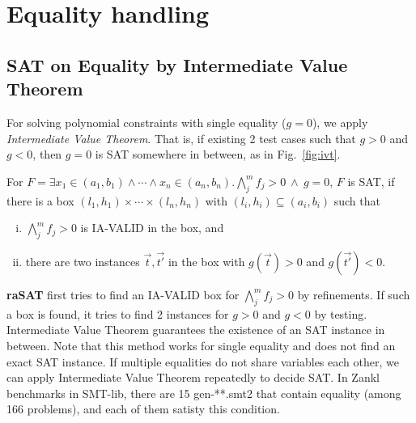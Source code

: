 \chapter{Equality handling}

\section{SAT on Equality by Intermediate Value Theorem} \label{sec:eq}
For solving polynomial constraints with single equality ($g=0$), we apply {\em Intermediate Value Theorem}. 
That is, if existing 2 test cases such that $g > 0$ and $g < 0$, then $g=0$ is SAT somewhere in between, 
as in Fig.~\ref{fig:ivt}. 

\begin{lemma} \label{lemma:ivt}
For $F = \exists x_1 \in (a_1,b_1) \wedge \cdots \wedge x_n \in (a_n,b_n). 
\bigwedge \limits_{j}^m f_j > 0~\wedge~g = 0$, $F$ is SAT, if 
there is a box $(l_1, h_1) \times \cdots \times (l_n,h_n)$ with $ (l_i,h_i) \subseteq (a_i,b_i)$ 
such that 
\begin{enumerate}[(i)]
\item $\bigwedge \limits_{j}^m f_j > 0$ is IA-VALID in the box, and 
\item there are two instances $\vec{t},\vec{t'}$ in the box with $g(\vec{t}) > 0$ and $g(\vec{t'}) < 0$.
\end{enumerate}
\end{lemma}

{\bf raSAT} first tries to find an IA-VALID box for $\bigwedge \limits_{j}^m f_j > 0$ by refinements. 
If such a box is found, it tries to find 2 instances for $g > 0$ and $g < 0$ by testing. 
Intermediate Value Theorem guarantees the existence of an SAT instance in between. 
Note that this method works for single equality and does not find an exact SAT instance. 
If multiple equalities do not share variables each other, we can apply Intermediate Value Theorem 
repeatedly to decide SAT. In Zankl benchmarks in SMT-lib, there are 15 gen-**.smt2 that contain equality
(among 166 problems), and each of them satisty this condition. 

